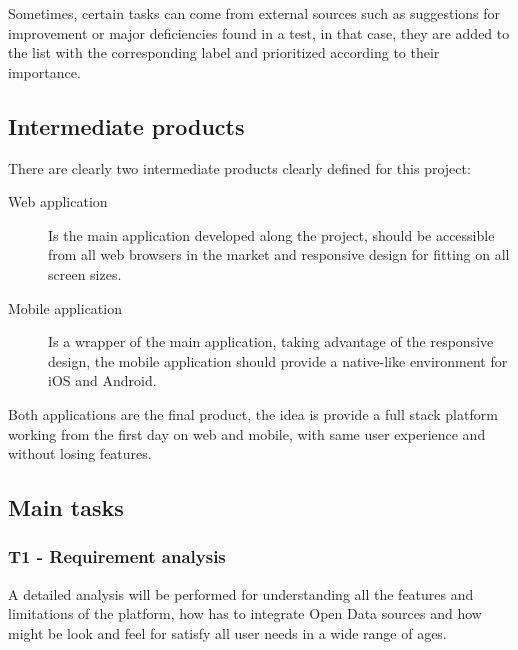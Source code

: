 \documentclass{DeustoFDP}
\begin{document}
Sometimes, certain tasks can come from external sources such as suggestions for improvement or major deficiencies found in a test, in that case, they are added to the list with the corresponding label and prioritized according to their importance.
\subsection{Intermediate products}
There are clearly two intermediate products clearly defined for this project:

\begin{description}
	\item[Web application] Is the main application developed along the project, should be accessible from all web browsers in the market and responsive design for fitting on all screen sizes. 
	\item[Mobile application] Is a wrapper of the main application, taking advantage of the responsive design, the mobile application should provide a native-like environment for iOS and Android.
\end{description}

Both applications are the final product, the idea is provide a full stack platform working from the first day on web and mobile, with same user experience and without losing features. 

\subsection{Main tasks}
\subsubsection{T1 - Requirement analysis}
A detailed analysis will be performed for understanding all the features and limitations of the platform, how has to integrate Open Data sources and how might be look and feel for satisfy all user needs in a wide range of ages.
\end{document}

